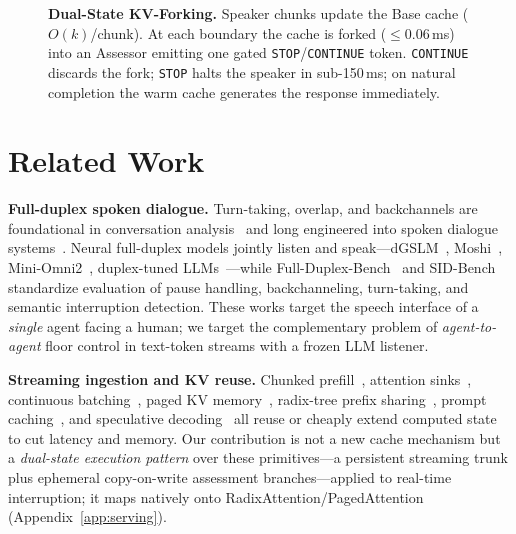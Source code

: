 \documentclass{article}
\begin{document}
\begin{figure}[t]
{%
}
\caption{\textbf{Dual-State KV-Forking.} Speaker chunks update the Base cache ($O(k)$/chunk). At each boundary the cache is forked ($\le$0.06\,ms) into an Assessor emitting one gated \texttt{STOP}/\texttt{CONTINUE} token. \texttt{CONTINUE} discards the fork; \texttt{STOP} halts the speaker in sub-150\,ms; on natural completion the warm cache generates the response immediately.}
\label{fig:dual_state_arch}
\end{figure}

\section{Related Work}
\label{sec:related}

\textbf{Full-duplex spoken dialogue.} Turn-taking, overlap, and backchannels are foundational in conversation analysis~\citep{sacks1974turntaking, yngve1970} and long engineered into spoken dialogue systems~\citep{skantze2021review, lin2022duplex}. Neural full-duplex models jointly listen and speak---dGSLM~\citep{nguyen2023dgslm}, Moshi~\citep{defossez2024moshi}, Mini-Omni2~\citep{xie2024miniomni2}, duplex-tuned LLMs~\citep{zhang2024duplexmodels}---while Full-Duplex-Bench~\citep{lin2025fdbench, lin2025fdbenchv2} and SID-Bench~\citep{xia2026sidbench} standardize evaluation of pause handling, backchanneling, turn-taking, and semantic interruption detection. These works target the speech interface of a \emph{single} agent facing a human; we target the complementary problem of \emph{agent-to-agent} floor control in text-token streams with a frozen LLM listener.

\textbf{Streaming ingestion and KV reuse.} Chunked prefill~\citep{agrawal2023sarathi}, attention sinks~\citep{xiao2023streamingllm}, continuous batching~\citep{yu2022orca}, paged KV memory~\citep{kwon2023vllm}, radix-tree prefix sharing~\citep{zheng2023sglang}, prompt caching~\citep{gim2024promptcache}, and speculative decoding~\citep{leviathan2023speculative} all reuse or cheaply extend computed state to cut latency and memory. Our contribution is not a new cache mechanism but a \emph{dual-state execution pattern} over these primitives---a persistent streaming trunk plus ephemeral copy-on-write assessment branches---applied to real-time interruption; it maps natively onto RadixAttention/PagedAttention (Appendix~\ref{app:serving}).
\end{document}
